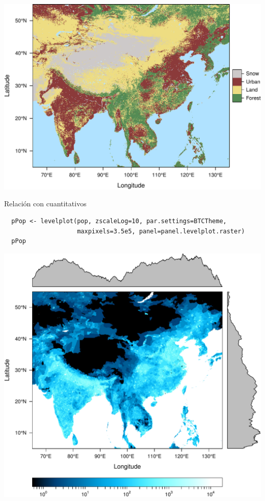 \documentclass[xcolor={usenames,svgnames,dvipsnames}]{beamer}
\begin{document}
\begin{frame}[label=sec-3-4]{}
\includegraphics[width=.9\linewidth]{figs/landClass.pdf}
\end{frame}

\begin{frame}[fragile,label=sec-3-5]{Relación con cuantitativos}
 \lstset{language=R,label= ,caption= ,numbers=none}
\begin{lstlisting}
  pPop <- levelplot(pop, zscaleLog=10, par.settings=BTCTheme,
                    maxpixels=3.5e5, panel=panel.levelplot.raster)
  pPop
\end{lstlisting}
\end{frame}

\begin{frame}[label=sec-3-6]{}
\includegraphics[width=.9\linewidth]{figs/populationNASA.pdf}
\end{frame}
\end{document}

